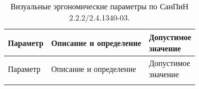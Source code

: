 \begin{center}
    \begin{longtable}{|l|l|l|}
	    \caption{\label{tab:visual} Визуальные эргономические параметры по СанПиН 2.2.2/2.4.1340-03.} \\
            \hline
            Параметр & Описание и определение & \specialcell{Допустимое\\значение} \\
            \hline
            \endfirsthead
            Параметр & Описание и определение & \specialcell{Допустимое\\значение} \\
            \hline
            \endhead

            \endfoot

            \endlastfoot


\end{longtable}
\end{center}
